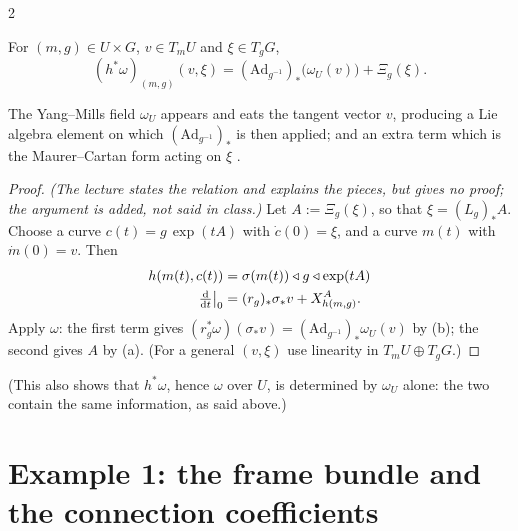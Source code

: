 \begin{paracol}{2}
\begin{theorem}\label{thm:ym-local}
For $(m,g)\in U\times G$, $v\in T_mU$ and $\xi\in T_gG$,
\[
  (h^*\omega)_{(m,g)}(v,\xi)=(\mathrm{Ad}_{g^{-1}})_*\bigl(\omega_U(v)\bigr)+\Xi_g(\xi) .
\]
    
\end{theorem}
The Yang--Mills field $\omega_U$ appears and eats the tangent vector $v$, producing a Lie algebra element on which $(\mathrm{Ad}_{g^{-1}})_*$ is then applied; and an extra term which is the Maurer--Cartan form acting on $\xi$  .
\begin{proof}
\emph{(The lecture states the relation and explains the pieces, but gives no proof; the argument is added, not said in class.)} Let $A:=\Xi_g(\xi)$, so that $\xi=(L_g)_*A$. Choose a curve $c(t)=g\,\exp(tA)$ with $\dot c(0)=\xi$, and a curve $m(t)$ with $\dot m(0)=v$. Then
\[
  \begin{aligned}
  h(m(t),c(t))&=\sigma(m(t))\mathbin{\triangleleft} g\mathbin{\triangleleft}\exp(tA)\\
  \tfrac{\mathrm d}{\mathrm dt}\big|_0&=(r_g)_*\sigma_*v+X^A_{h(m,g)} .
  \end{aligned}
\]
Apply $\omega$: the first term gives $(r_g^*\omega)(\sigma_*v)=(\mathrm{Ad}_{g^{-1}})_*\omega_U(v)$ by (b); the second gives $A$ by (a). (For a general $(v,\xi)$ use linearity in $T_mU\oplus T_gG$.)
\end{proof}
(This also shows that $h^*\omega$, hence $\omega$ over $U$, is determined by $\omega_U$ alone: the two contain the same information, as said above.)

\section{Example 1: the frame bundle and the connection coefficients}\label{sec:ym-frame}


\end{paracol}
